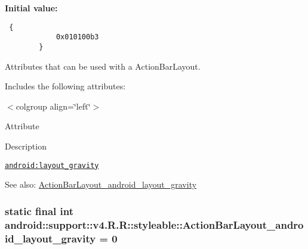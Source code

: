 \textbf{Initial value:}

\begin{Code}\begin{verbatim} {
            0x010100b3
        }
\end{verbatim}
\end{Code}
Attributes that can be used with a ActionBarLayout. 

Includes the following attributes: \begin{TabularC}{0}
\hline
\end{TabularC}
$<$colgroup align=\char`\"{}left\char`\"{}$>$ 

Attribute

Description 

{\tt \hyperlink{classandroid_1_1support_1_1v4_1_1_r_1_1styleable_6bc8c975c8164ed43a3d31fcac401931}{android:layout\_\-gravity}}

\begin{Desc}
\item[See also:]\hyperlink{classandroid_1_1support_1_1v4_1_1_r_1_1styleable_6bc8c975c8164ed43a3d31fcac401931}{ActionBarLayout\_\-android\_\-layout\_\-gravity} \end{Desc}
\hypertarget{classandroid_1_1support_1_1v4_1_1_r_1_1styleable_6bc8c975c8164ed43a3d31fcac401931}{
\subsubsection[{ActionBarLayout\_\-android\_\-layout\_\-gravity}]{\setlength{\rightskip}{0pt plus 5cm}static final int android::support::v4.R.R::styleable::ActionBarLayout\_\-android\_\-layout\_\-gravity = 0}}
\label{classandroid_1_1support_1_1v4_1_1_r_1_1styleable_6bc8c975c8164ed43a3d31fcac401931}


